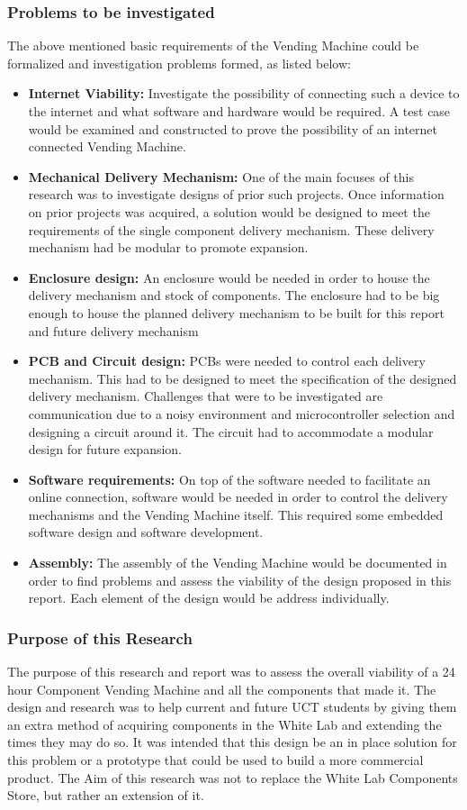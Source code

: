 \documentclass[a4paper,11pt]{article}
\numberwithin{figure}{section}
\numberwithin{table}{section}
\begin{document}
		\subsubsection{Problems to be investigated}
The above mentioned basic requirements of the Vending Machine could be formalized and investigation problems formed, as listed below:
\begin{itemize}
\item \textbf{Internet Viability:} Investigate the possibility of connecting such a device to the internet and what software and hardware would be required. A test case would be examined and constructed to prove the possibility of an internet connected Vending Machine.
\item \textbf{Mechanical Delivery Mechanism:} One of the main focuses of this research was to investigate designs of prior such projects. Once information on prior projects was acquired, a solution would be designed to meet the requirements of the single component delivery mechanism. These delivery mechanism had be modular to promote expansion.
\item \textbf{Enclosure design:} An enclosure would be needed in order to house the delivery mechanism and stock of components. The enclosure had to be big enough to house the planned delivery mechanism to be built for this report and future delivery mechanism
\item \textbf{PCB and Circuit design:} PCBs were needed to control each delivery mechanism. This had to be designed to meet the specification of the designed delivery mechanism. Challenges that were to be investigated are communication due to a noisy environment and microcontroller selection and designing a circuit around it. The circuit had to accommodate a modular design for future expansion.
\item \textbf{Software requirements:} On top of the software needed to facilitate an online connection, software would be needed in order to control the delivery mechanisms and the Vending Machine itself. This required some embedded software design and software development. 
\item \textbf{Assembly:} The assembly of the Vending Machine would be documented in order to find problems and assess the viability of the design proposed in this report. Each element of the design would be address individually.
\end{itemize}
		\subsubsection{Purpose of this Research}
The purpose of this research and report was to assess the overall viability of a 24 hour Component Vending Machine and all the components that made it. The design and research was to help current and future UCT students by giving them an extra method of acquiring components in the White Lab and extending the times they may do so. It was intended that this design be an in place solution for this problem or a prototype that could be used to build a more commercial product. The Aim of this research was not to replace the White Lab Components Store, but rather an extension of it.
\end{document}
